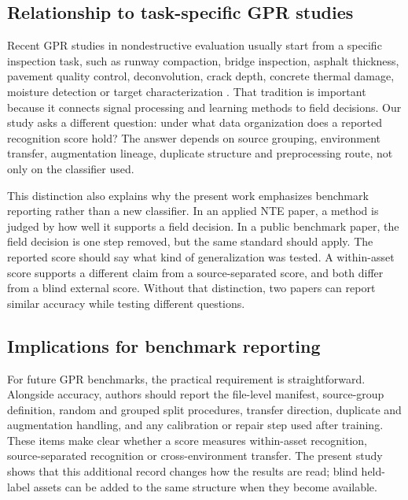 \documentclass[]{interact}
\begin{document}
\subsection{Relationship to task-specific GPR studies}

Recent GPR studies in nondestructive evaluation usually start from a specific inspection task, such as runway compaction, bridge inspection, asphalt thickness, pavement quality control, deconvolution, crack depth, concrete thermal damage, moisture detection or target characterization \cite{cheng2023runway,wang2024crack,artagan2022thermal,plati2012structural,benedetto2012bridges,economou2012deconvolution,poikajarvi2012road,hu2016pavement,lualdi2014polarisation,kilic2014moisture}. That tradition is important because it connects signal processing and learning methods to field decisions. Our study asks a different question: under what data organization does a reported recognition score hold? The answer depends on source grouping, environment transfer, augmentation lineage, duplicate structure and preprocessing route, not only on the classifier used.

This distinction also explains why the present work emphasizes benchmark reporting rather than a new classifier. In an applied NTE paper, a method is judged by how well it supports a field decision. In a public benchmark paper, the field decision is one step removed, but the same standard should apply. The reported score should say what kind of generalization was tested. A within-asset score supports a different claim from a source-separated score, and both differ from a blind external score. Without that distinction, two papers can report similar accuracy while testing different questions.

\subsection{Implications for benchmark reporting}

For future GPR benchmarks, the practical requirement is straightforward. Alongside accuracy, authors should report the file-level manifest, source-group definition, random and grouped split procedures, transfer direction, duplicate and augmentation handling, and any calibration or repair step used after training. These items make clear whether a score measures within-asset recognition, source-separated recognition or cross-environment transfer. The present study shows that this additional record changes how the results are read; blind held-label assets can be added to the same structure when they become available.
\end{document}
